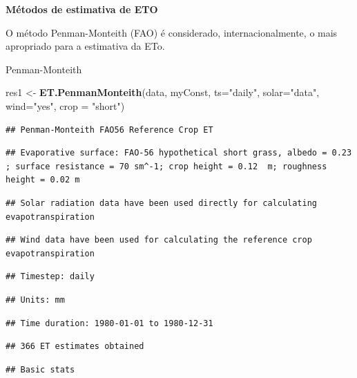 \documentclass[
]{book}
\newenvironment{Shaded}{\begin{snugshade}}{\end{snugshade}}
\newcommand{\DataTypeTok}[1]{\textcolor[rgb]{0.13,0.29,0.53}{#1}}
\newcommand{\KeywordTok}[1]{\textcolor[rgb]{0.13,0.29,0.53}{\textbf{#1}}}
\newcommand{\NormalTok}[1]{#1}
\newcommand{\StringTok}[1]{\textcolor[rgb]{0.31,0.60,0.02}{#1}}
\begin{document}
\textbf{Métodos de estimativa de ETO}

O método Penman-Monteith (FAO) é considerado, internacionalmente, o mais apropriado para a estimativa da ETo.

Penman-Monteith

\begin{Shaded}
\begin{Highlighting}[]
\NormalTok{res1 <-}\StringTok{ }\KeywordTok{ET.PenmanMonteith}\NormalTok{(data,  myConst, }\DataTypeTok{ts=}\StringTok{"daily"}\NormalTok{, }\DataTypeTok{solar=}\StringTok{"data"}\NormalTok{, }\DataTypeTok{wind=}\StringTok{"yes"}\NormalTok{, }\DataTypeTok{crop =} \StringTok{"short"}\NormalTok{)}
\end{Highlighting}
\end{Shaded}

\begin{verbatim}
## Penman-Monteith FAO56 Reference Crop ET
\end{verbatim}

\begin{verbatim}
## Evaporative surface: FAO-56 hypothetical short grass, albedo = 0.23 ; surface resistance = 70 sm^-1; crop height = 0.12  m; roughness height = 0.02 m
\end{verbatim}

\begin{verbatim}
## Solar radiation data have been used directly for calculating evapotranspiration
\end{verbatim}

\begin{verbatim}
## Wind data have been used for calculating the reference crop evapotranspiration
\end{verbatim}

\begin{verbatim}
## Timestep: daily
\end{verbatim}

\begin{verbatim}
## Units: mm
\end{verbatim}

\begin{verbatim}
## Time duration: 1980-01-01 to 1980-12-31
\end{verbatim}

\begin{verbatim}
## 366 ET estimates obtained
\end{verbatim}

\begin{verbatim}
## Basic stats
\end{verbatim}
\end{document}
